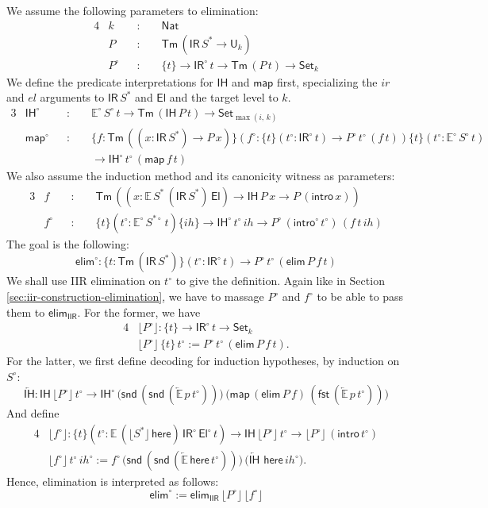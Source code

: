 \documentclass[acmsmall,screen,review,anonymous]{acmart}
\newcommand{\msf}[1]{{\mathsf{#1}}}
\newcommand{\mbb}[1]{\mathbb{#1}}
\newcommand{\U}{\msf{U}}
\newcommand{\Set}{\msf{Set}}
\newcommand{\Nat}{\msf{Nat}}
\newcommand{\El}{\msf{El}}
\newcommand{\ir}{{ir}}
\newcommand{\el}{{el}}
\newcommand{\IR}{\msf{IR}}
\newcommand{\ih}{{ih}}
\newcommand{\intro}{\msf{intro}}
\newcommand{\IH}{\msf{IH}}
\newcommand{\map}{\msf{map}}
\newcommand{\elim}{\msf{elim}}
\newcommand{\fst}{\msf{fst}}
\newcommand{\snd}{\msf{snd}}
\newcommand{\IIR}{\msf{IIR}}
\newcommand{\floord}[1]{\lfloor #1 \rfloor}
\newcommand{\ola}[1]{\overleftarrow{#1}}
\newcommand{\Tm}{\msf{Tm}}
\newcommand{\w}{\circ}
\newcommand{\here}{\msf{here}}
\newcommand{\E}{\mbb{E}}
\begin{document}
\begin{definition}[Interpretation of $\elim$] \label{def:ir-canonicity-elim}
We assume the following parameters to elimination:
\begin{alignat*}{4}
  &k    &&:\,\,&&\Nat\\
  &P    &&:&& \Tm\,(\IR\,S^* \to \U_k)\\
  &P^\w &&:&& \{t\} \to \IR^\w\,t \to \Tm\,(P\,t) \to \Set_k
\end{alignat*}
We define the predicate interpretations for $\IH$ and $\map$ first, specializing the $\ir$ and $\el$
arguments to $\IR\,S^*$ and $\El$ and the target level to $k$.
\begin{alignat*}{3}
  &\IH^\w  &&:\,\,&& \E^\w\,S^\w\,t \to \Tm\,(\IH\,P\,t) \to \Set_{\max(i,\,k)}\\
  &\map^\w &&:\,\,&& \{f : \Tm\,((x : \IR\,S^*) \to P\,x)\}(f^\w : \{t\}(t^\w : \IR^\w\,t) \to P^\w\,t^\w\,(f\,t))\{t\}(t^\w : \E^\w\,S^\w\,t)\\
  &        &&    &&  \to \IH^\w\,t^\w\,(\map\,f\,t)
\end{alignat*}
We also assume the induction method and its canonicity witness as parameters:
\begin{alignat*}{3}
  &f    &&:\,\,&& \Tm\,((x : \E\,S^*\,(\IR\,S^*)\,\El) \to \IH\,P\,x \to P\,(\intro\,x))\\
  &f^\w &&:\,\,&& \{t\}(t^\w : \E^\w\,S^{*\w}\,t)\{\ih\} \to \IH^\w\,t^\w\,\ih \to P^\w\,(\intro^\w\,t^\w)\,(f\,t\,\ih)
\end{alignat*}
The goal is the following:
\[ \elim^\w : \{t : \Tm\,(\IR\,S^*)\}(t^\w : \IR^\w\,t) \to P^\w\,t^\w\,(\elim\,P\,f\,t)  \]
We shall use IIR elimination on $t^\w$ to give the definition. Again like in Section \ref{sec:iir-construction-elimination}, we
have to massage $P^\w$ and $f^\w$ to be able to pass them to $\elim_\IIR$. For the former, we have
\begin{alignat*}{4}
  &\floord{P^\w} : \{t\} \to \IR^\w\,t \to \Set_k\\
  &\floord{P^\w}\,\{t\}\,t^\w := P^\w\,t^\w\,(\elim\,P\,f\,t).
\end{alignat*}
For the latter, we first define decoding for induction hypotheses, by induction
on $S^\w$:
\[ \ola{\IH} : \IH\,\floord{P^\w}\,t^\w \to
      \IH^\w\,\big(\snd\,(\snd\,(\ola{\E}\,p\,t^\w))\big)\,\big(\map\,(\elim\,P\,f)\,(\fst\,(\ola{\E}\,p\,t^\w))\big) \]
And define
\begin{alignat*}{4}
  &\floord{f^\w} : \{t\}(t^\w : \E\,(\floord{S^*}\,\here)\,\IR^\w\,\El^\w\,t) \to \IH\,\floord{P^\w}\,t^\w \to \floord{P^\w}\,(\intro\,t^\w)\\
  &\floord{f^\w}\,t^\w\,\ih^\w := f^\w\,\big(\snd\,(\snd\,(\ola{\E}\,\here\,t^\w))\big)\,\big(\ola{\IH}\,\,\here\,\ih^\w\big).
\end{alignat*}
Hence, elimination is interpreted as follows:
\[ \elim^\w := \elim_\IIR\,\floord{P^\w}\,\floord{f^\w} \]
\end{definition}
\end{document}
